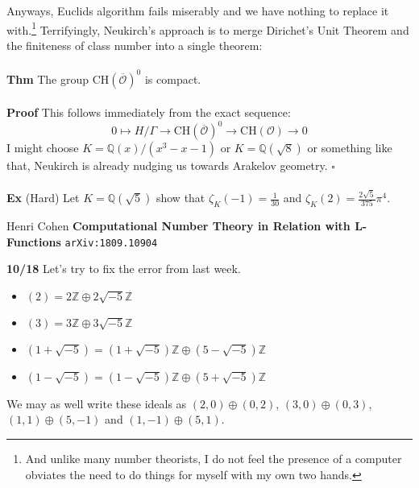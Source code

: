 \documentclass[12pt]{article}
\begin{document}
\newpage

\noindent Anyways, Euclids algorithm fails miserably and we have nothing to replace it with.\footnote{And unlike many number theorists, I do not feel the presence of a computer obviates the need to do things for myself with my own two hands.} Terrifyingly, Neukirch's approach is to merge Dirichet's Unit Theorem and the finiteness of class number into a single theorem:\\ \\
\textbf{Thm} The group $\text{CH}(\overline{\mathcal{O}})^0$ is compact. \\ \\
\textbf{Proof} This follows immediately from the exact sequence:
$$ 0 \mapsto H/\Gamma \to \text{CH}(\overline{\mathcal{O}})^0 \to \text{CH}(\mathcal{O}) \to 0 $$
I might choose $K = \mathbb{Q}(x)/(x^3 - x - 1)$ or $K = \mathbb{Q}(\sqrt{8})$ or something like that, Neukirch is already nudging us towards Arakelov geometry. \hfill $\square$\\ \\
\textbf{Ex} (Hard) Let $K = \mathbb{Q}(\sqrt{5})$ show that $\zeta_K(-1) = \frac{1}{30}$ and $\zeta_K(2) =\frac{2\sqrt{5}}{375} \pi^4 $.

\vfill
\begin{thebibliography}{}

\item Henri Cohen \textbf{Computational Number Theory in Relation with L-Functions} \texttt{arXiv:1809.10904}

\end{thebibliography}

\newpage 

\noindent \textbf{10/18}  Let's try to fix the error from last week. \\
\begin{itemize}
\item $(2) = 2\mathbb{Z} \oplus 2\sqrt{-5}\mathbb{Z}$
\item $(3) = 3\mathbb{Z} \oplus 3\sqrt{-5}\mathbb{Z}$
\item $(1+\sqrt{-5}) = (1 + \sqrt{-5})\mathbb{Z} \oplus (5 - \sqrt{-5})\mathbb{Z}$
\item $(1-\sqrt{-5}) = (1 - \sqrt{-5})\mathbb{Z} \oplus (5 + \sqrt{-5})\mathbb{Z}$
\end{itemize}
We may as well write these ideals as $(2,0)\oplus(0,2)$, $(3,0)\oplus(0,3)$,
$(1,1)\oplus(5,-1)$ and $(1,-1)\oplus(5,1)$. \\
\end{document}
